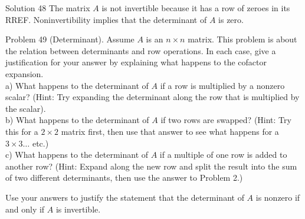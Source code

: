 \documentclass[10pt]{article}
\begin{document}
Solution 48 The matrix $A$ is not invertible because it has a row of zeroes in its RREF. Noninvertibility implies that the determinant of $A$ is zero.

Problem 49 (Determinant). Assume $A$ is an $n \times n$ matrix. This problem is about the relation between determinants and row operations. In each case, give a justification for your answer by explaining what happens to the cofactor expansion.\\
a) What happens to the determinant of $A$ if a row is multiplied by a nonzero scalar? (Hint: Try expanding the determinant along the row that is multiplied by the scalar).\\
b) What happens to the determinant of $A$ if two rows are swapped? (Hint: Try this for a $2 \times 2$ matrix first, then use that answer to see what happens for a $3 \times 3 \ldots$ etc.)\\
c) What happens to the determinant of $A$ if a multiple of one row is added to another row? (Hint: Expand along the new row and split the result into the sum of two different determinants, then use the answer to Problem 2.)

Use your answers to justify the statement that the determinant of $A$ is nonzero if and only if $A$ is invertible.
\end{document}
